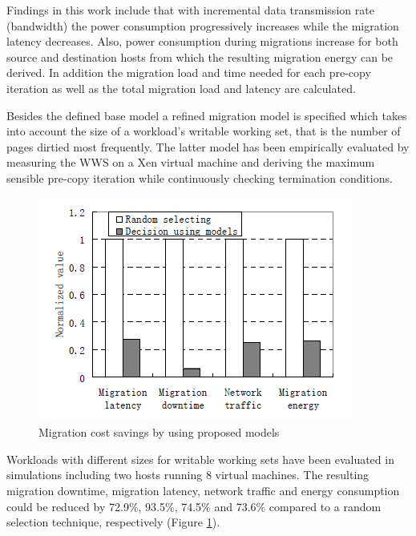 Findings in this work include that with incremental data transmission rate (bandwidth) the power consumption progressively increases while the migration latency decreases. Also, power consumption during migrations increase for both source and destination hosts from which the resulting migration energy can be derived. In addition the migration load and time needed for each pre-copy iteration as well as the total migration load and latency are calculated. 

Besides the defined base model a refined migration model is specified which takes into account the size of a workload's writable working set, that is the number of pages dirtied most frequently. The latter model has been empirically evaluated by measuring the WWS on a Xen virtual machine and deriving the maximum sensible pre-copy iteration while continuously checking termination conditions. 

\begin{figure}[htbp]
	\centering
		\includegraphics{figures/state_of_the_art/vm_migration_normalized_cost.PNG}
	\caption{Migration cost savings by using proposed models \cite{liu2013performance}}
	\label{fig:vm_migration_normalized_cost}
\end{figure}

Workloads with different sizes for writable working sets have been evaluated in simulations including two hosts running 8 virtual machines. 
The resulting migration downtime, migration latency, network traffic and energy consumption could be reduced by 72.9\%, 93.5\%, 74.5\% and 73.6\% compared to a random selection technique, respectively (Figure \ref{fig:vm_migration_normalized_cost}). 














